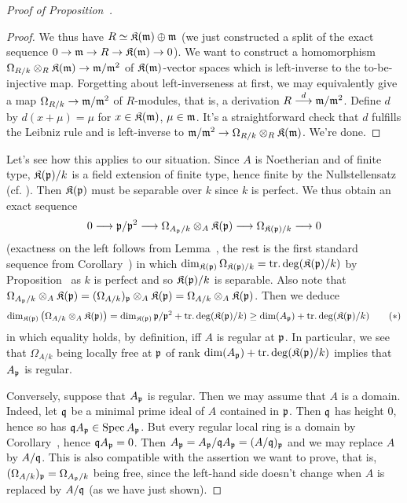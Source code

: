 \documentclass[a4paper,parskip=half,numbers=enddot, DIV=12, headheight=30pt]{scrreprt}
\begin{document}
\begin{proof}[Proof of Proposition~]
\begin{proof}
	We thus have $R\simeq \mathfrak{K}(\mathfrak{m})\oplus\mathfrak{m}$ (we just constructed a split of the exact sequence $0\morphism \mm\morphism R\morphism\KK(\mm)\morphism 0$). We want to construct a homomorphism $\Omega_{R/k}\otimes_R\KK(\mm)\morphism\mm/\mm^2$ of $\mathfrak{K}(\mathfrak{m})$-vector spaces which is left-inverse to the to-be-injective map. Forgetting about left-inverseness at first, we may equivalently give a map $\Omega_{R/k}\morphism\mm/\mm^2$ of $R$-modules, that is, a derivation $R\morphism[d]\mm/\mm^2$. Define $d$ by $d(x+\mu)=\mu$ for $x\in\mathfrak{K}(\mathfrak{m})$, $\mu\in\mathfrak{m}$. It's a straightforward check that $d$ fulfills the Leibniz rule and is left-inverse to $\mm/\mm^2\morphism\Omega_{R/k}\otimes_R\KK(\mm)$. We're done.
\end{proof}
Let's see how this applies to our situation. Since $A$ is Noetherian and of finite type, $\mathfrak{K}(\mathfrak{p})/k$ is a field extension of finite type, hence finite by the Nullstellensatz (cf. \cite[Theorem~4]{alg1}). Then $\mathfrak{K}(\mathfrak{p})$ must be separable over $k$ since $k$ is perfect. We thus obtain an exact sequence
\begin{align*}
	0\morphism\pp/\pp^2\morphism\Omega_{A_\pp/k}\otimes_A\KK(\pp)\morphism\Omega_{\KK(\pp)/k}\morphism 0
\end{align*}
(exactness on the left follows from Lemma~, the rest is the first standard sequence from Corollary~) in which $\dim_{\mathfrak{K}(\mathfrak{p})}\Omega_{\mathfrak{K}(\mathfrak{p})/k}=\operatorname{tr.deg}(\mathfrak{K}(\mathfrak{p})/k)$ by Proposition~ as $k$ is perfect and so $\mathfrak{K}(\mathfrak{p})/k$ is separable. Also note that $\Omega_{A_{\mathfrak{p}}/k}\otimes_A\mathfrak{K}(\mathfrak{p})=(\Omega_{A/k})_{\mathfrak{p}}\otimes_A\mathfrak{K}(\mathfrak{p})=\Omega_{A/k}\otimes_A\mathfrak{K}(\mathfrak{p})$. Then we deduce
\begin{align}\lbl{eq:dimOmega}
	\dim_{\KK(\pp)}\left(\Omega_{A/k}\otimes_A\KK(\pp)\right)=\dim_{\KK(\pp)}\pp/\pp^2+\trdeg(\KK(\pp)/k)\geq\dim (A_\pp)+\trdeg(\KK(\pp)/k)\tag{$*$}
\end{align}
in which equality holds, by definition, iff $A$ is regular at $\mathfrak{p}$. In particular, we see that $\Omega_{A/k}$ being locally free at $\mathfrak{p}$ of rank $\dim(A_{\mathfrak{p}})+\operatorname{tr.deg}(\mathfrak{K}(\mathfrak{p})/k)$ implies that $A_{\mathfrak{p}}$ is regular.

Conversely, suppose that $A_{\mathfrak{p}}$ is regular. Then we may assume that $A$ is a domain. Indeed, let $\mathfrak{q}$ be a minimal prime ideal of $A$ contained in $\mathfrak{p}$. Then $\mathfrak{q}$ has height $0$, hence so has $\mathfrak{q} A_{\mathfrak{p}}\in \operatorname{Spec} A_{\mathfrak{p}}$. But every regular local ring is a domain by Corollary~, hence $\mathfrak{q} A_{\mathfrak{p}}=0$. Then $A_{\mathfrak{p}}=A_{\mathfrak{p}}/\mathfrak{q} A_{\mathfrak{p}}=(A/\mathfrak{q})_{\mathfrak{p}}$ and we may replace $A$ by $A/\mathfrak{q}$. This is also compatible with the assertion we want to prove, that is, $(\Omega_{A/k})_{\mathfrak{p}}=\Omega_{A_{\mathfrak{p}}/k}$ being free, since the left-hand side doesn't change when $A$ is replaced by $A/\mathfrak{q}$ (as we have just shown).


\end{proof}
\end{document}
